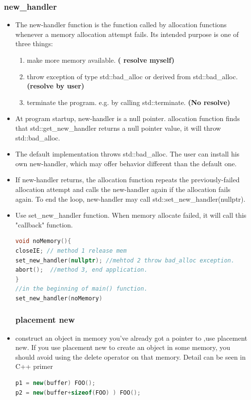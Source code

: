 \documentclass[a4paper,12pt,twoside]{book}
\begin{document}
\subsubsection{new\_handler}
\begin{itemize}
\item  The new-handler function is the function called by allocation functions whenever a memory allocation attempt fails. Its intended purpose is one of three things:
\begin{enumerate}
\item make more memory available. \textbf{( resolve myself)}

\item throw exception of type std::bad\_alloc or derived from std::bad\_alloc. \textbf{(resolve by user)}

\item terminate the program. e.g. by calling std::terminate. \textbf{(No resolve)}
\end{enumerate}

\item At program startup, new-handler is a null pointer. allocation function finds that std::get\_new\_handler returns a null pointer value, it will throw std::bad\_alloc.

\item The default implementation throws std::bad\_alloc. The user can install his own new-handler, which may offer behavior different than the default one.


\item If new-handler returns, the allocation function repeats the previously-failed allocation attempt and calls the new-handler again if the allocation fails again. To end the loop, new-handler may call std::set\_new\_handler(nullptr).


\item Use set\_new\_handler function. When memory allocate failed, it will call this "callback" function.
\begin{lstlisting}[frame=single, language=c++]
void noMemory(){
closeIE; // method 1 release mem
set_new_handler(nullptr); //mehtod 2 throw bad_alloc exception.
abort();  //method 3, end application.
}
//in the beginning of main() function.
set_new_handler(noMemory)
\end{lstlisting}

\subsubsection{placement new}
\item construct an object in memory you've already got a pointer to ,use placement new. If you use placement new to create an object in some memory, you should avoid using the delete operator on that memory.  Detail can be seen in C++ primer
\begin{lstlisting}[frame=single, language=c++]
p1 = new(buffer) FOO();
p2 = new(buffer+sizeof(FOO) ) FOO();


\end{lstlisting}
\end{itemize}
\end{document}
